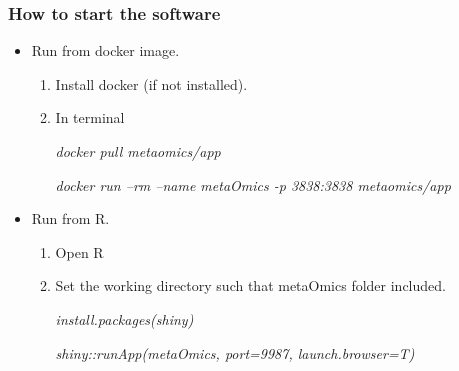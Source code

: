 \subsubsection{How to start the software}
\begin{itemize}
\item Run from docker image.

\begin{enumerate}
\item Install docker (if not installed).
\item In terminal

\textit{docker pull metaomics/app}

\textit{docker run --rm --name metaOmics -p 3838:3838 metaomics/app}

\end{enumerate}


\item Run from R.

\begin{enumerate}
\item Open R 
\item Set the working directory such that metaOmics folder included. 

\textit{install.packages(\textquotesingle shiny\textquotesingle)}

\textit{shiny::runApp(\textquotesingle metaOmics\textquotesingle, port=9987, launch.browser=T)}
\end{enumerate}



\end{itemize}

